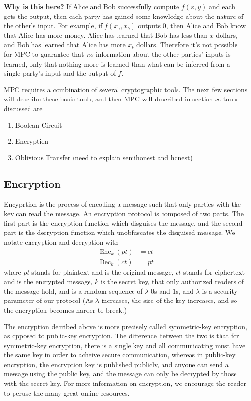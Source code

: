 \documentclass[12pt,twoside]{reedthesis}
\newcommand{\Enc}{\operatorname{Enc}}
\newcommand{\Dec}{\operatorname{Dec}}
\begin{document}
\textbf{Why is this here?}
If Alice and Bob successfully compute $f(x,y)$ and each gets the output, then each party has gained some knowledge about the nature of the other's input.
For example, if $f(x_a,x_b)$ outputs $0$, then Alice and Bob know that Alice has more money.
Alice has learned that Bob has less than $x$ dollars, and Bob has learned that Alice has more $x_b$ dollars.
Therefore it's not possible for MPC to guarantee that \textit{no} information about the other parties' inputs is learned, only that nothing more is learned than what can be inferred from a single party's input and the output of $f$. 

MPC requires a combination of several cryptographic tools.
The next few sections will describe these basic tools, and then MPC will described in section $x$. 
tools discussed are 
\begin{enumerate}
    \item Boolean Circuit
    \item Encryption
    \item Oblivious Transfer (need to explain semihonest and honest)
\end{enumerate}

\subsection{Encryption}
Encyprtion is the process of encoding a message such that only parties with the key can read the message.
An encryption protocol is composed of two parts.
The first part is the encryption function which disguises the message, and the second part is the decryption function which unobfuscates the disguised message.
We notate encryption and decryption with
\begin{equation}
    \label{eqn:encryption}
    \begin{split}
        \Enc_k (pt) & = ct  \\
        \Dec_k(ct) & = pt
    \end{split}
\end{equation}
where $pt$ stands for plaintext and is the original message, $ct$ stands for ciphertext and is the encrypted message, $k$ is the secret key, that only authorized readers of the message hold, and is a random sequence of $\lambda$ $0$s and $1$s, and $\lambda$ is a security parameter of our protocol (As $\lambda$ increases, the size of the key increases, and so the encryption becomes harder to break.)

The encryption decribed above is more precisely called symmetric-key encryption, as opposed to public-key encryption.
The difference between the two is that for symmetric-key encryption, there is a single key and all communicating must have the same key in order to acheive secure communication, whereas in public-key encryption, the encryption key is published publicly, and anyone can send a message using the public key, and the message can only be decrypted by those with the secret key.
For more information on encryption, we encourage the reader to peruse the many great online resources.
\end{document}
